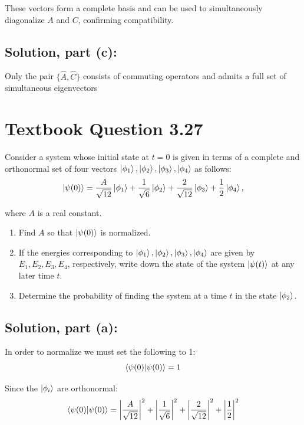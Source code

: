 \documentclass[12pt]{article}
\begin{document}
        These vectors form a complete basis and can be used to simultaneously diagonalize \( A \) and \( C \), confirming compatibility.

    \subsection{Solution, part (c):}
        Only the pair \( \{ \hat{A}, \hat{C} \} \) consists of commuting operators and admits a full set of simultaneous eigenvectors

\section{Textbook Question 3.27}
    Consider a system whose initial state at \( t = 0 \) is given in terms of a complete and orthonormal set of four vectors \( \ket{\phi_1}, \ket{\phi_2}, \ket{\phi_3}, \ket{\phi_4} \) as follows:
    \[
        \ket{\psi(0)} = \frac{A}{\sqrt{12}} \ket{\phi_1} + \frac{1}{\sqrt{6}} \ket{\phi_2} + \frac{2}{\sqrt{12}} \ket{\phi_3} + \frac{1}{2} \ket{\phi_4},
    \]
    
    where \( A \) is a real constant.
    
    \begin{enumerate}
        \item[(a)] Find \( A \) so that \( \ket{\psi(0)} \) is normalized.
        
        \item[(b)] If the energies corresponding to \( \ket{\phi_1}, \ket{\phi_2}, \ket{\phi_3}, \ket{\phi_4} \) are given by \( E_1, E_2, E_3, E_4 \), respectively, write down the state of the system \( \ket{\psi(t)} \) at any later time \( t \).
        
        \item[(c)] Determine the probability of finding the system at a time \( t \) in the state \( \ket{\phi_2} \).
    \end{enumerate}

    \subsection{Solution, part (a):}
        In order to normalize we must set the following to 1:
        \[
            \braket{\psi(0)}{\psi(0)} = 1
        \]

        Since the \( \ket{\phi_i} \) are orthonormal:
        \[
            \braket{\psi(0)}{\psi(0)} = \left|\frac{A}{\sqrt{12}}\right|^2 + \left|\frac{1}{\sqrt{6}}\right|^2 + \left|\frac{2}{\sqrt{12}}\right|^2 + \left|\frac{1}{2}\right|^2
        \]
\end{document}
